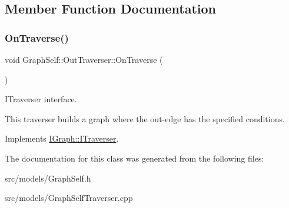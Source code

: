 \subsection{Member Function Documentation}
\mbox{\label{class_graph_self_1_1_out_traverser_a0f5e75bd44ae9b9cd0ae1984fd63095f}} 
\subsubsection{\texorpdfstring{On\+Traverse()}{OnTraverse()}}
{\footnotesize\ttfamily void Graph\+Self\+::\+Out\+Traverser\+::\+On\+Traverse (\begin{DoxyParamCaption}{ }\end{DoxyParamCaption})\hspace{0.3cm}{\ttfamily [virtual]}}



I\+Traverser interface. 

This traverser builds a graph where the out-\/edge has the specified conditions. 

Implements \hyperlink{class_i_graph_1_1_i_traverser_ac6a46d894404636ce0ecd7eb73de9b42}{I\+Graph\+::\+I\+Traverser}.



The documentation for this class was generated from the following files\+:\begin{DoxyCompactItemize}
\item 
src/models/Graph\+Self.\+h\item 
src/models/Graph\+Self\+Traverser.\+cpp\end{DoxyCompactItemize}

